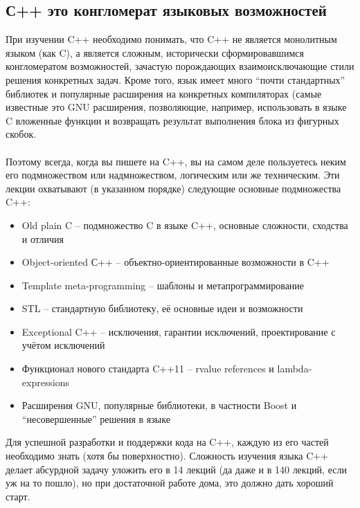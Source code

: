 \documentclass[a4paper,12pt,oneside]{article}
\begin{document}
\subsection{С++ это конгломерат языковых возможностей}

При изучении C++ необходимо понимать, что C++ не является монолитным языком (как C), а является сложным, исторически сформировавшимся конгломератом возможностей, зачастую порождающих взаимоисключающие стили решения конкретных задач. Кроме того, язык имеет много ``почти стандартных'' библиотек и популярные расширения на конкретных компиляторах (самые известные это GNU расширения, позволяющие, например, использовать в языке C вложенные функции и возвращать результат выполнения блока из фигурных скобок.
\paragraph{}
Поэтому всегда, когда вы пишете на C++, вы на самом деле пользуетесь неким его подмножеством или надмножеством, логическим или же техническим. Эти лекции охватывают (в указанном порядке) следующие основные подмножества C++:
\begin{itemize}
\item
Old plain C – подмножество C в языке C++, основные сложности, сходства и отличия
\item
Object-oriented С++ – объектно-ориентированные возможности в C++
\item
Template meta-programming – шаблоны и метапрограммирование
\item
STL – стандартную библиотеку, её основные идеи и возможности
\item
Exceptional C++ – исключения, гарантии исключений, проектирование с учётом исключений
\item
Функционал нового стандарта C++11 – rvalue references и  lambda-expressions
\item
Расширения GNU, популярные библиотеки, в частности Boost и ``несовершенные'' решения в языке
\end{itemize}
Для успешной разработки и поддержки кода на C++, каждую из его частей необходимо знать (хотя бы поверхностно). Сложность изучения языка C++ делает абсурдной задачу уложить его в 14 лекций (да даже и в 140 лекций, если уж на то пошло), но при достаточной работе дома, это должно дать хороший старт.
\end{document}
